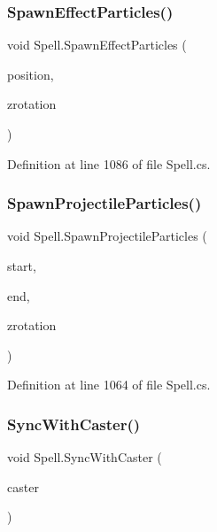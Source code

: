 \subsubsection{\texorpdfstring{SpawnEffectParticles()}{SpawnEffectParticles()}}
{\footnotesize\ttfamily void Spell.\+Spawn\+Effect\+Particles (\begin{DoxyParamCaption}\item[{Vector2\+Int}]{position,  }\item[{float}]{zrotation }\end{DoxyParamCaption})}



Definition at line 1086 of file Spell.\+cs.

\mbox{\label{class_spell_aaaea2d98c141ffd0838bac9ac5641349}} 
\subsubsection{\texorpdfstring{SpawnProjectileParticles()}{SpawnProjectileParticles()}}
{\footnotesize\ttfamily void Spell.\+Spawn\+Projectile\+Particles (\begin{DoxyParamCaption}\item[{Vector2\+Int}]{start,  }\item[{Vector2\+Int}]{end,  }\item[{float}]{zrotation }\end{DoxyParamCaption})}



Definition at line 1064 of file Spell.\+cs.

\mbox{\label{class_spell_a65c49405edc86456dfdace46c81b1530}} 
\subsubsection{\texorpdfstring{SyncWithCaster()}{SyncWithCaster()}}
{\footnotesize\ttfamily void Spell.\+Sync\+With\+Caster (\begin{DoxyParamCaption}\item[{\mbox{\hyperlink{class_base_unit}{Base\+Unit}}}]{caster }\end{DoxyParamCaption})}



